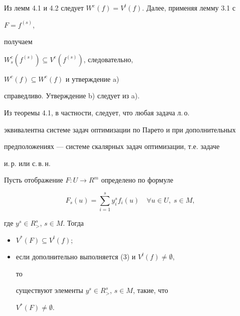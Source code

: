 \begin{pf}


Из лемм 4.1 и 4.2 следует $W^e(f)=V^l(f)$. Далее, применяя лемму 3.1 с


$F=f^{(s)}$,


получаем


$W^c_s(f^{(s)})\subseteq V^e(f^{(s)})$, следовательно,


$W^c(f)\subseteq W^e(f)$ и утверждение a)


справедливо. Утверждение b) следует из a).


\end{pf}





Из теоремы 4.1, в частности, следует, что любая задача л.\,о.


эквивалентна системе задач оптимизации по Парето и при дополнительных


предположениях --- системе скалярных задач оптимизации, т.е. задаче


и.\,р. или с.\,в.\,н.





\begin{cors}


Пусть отображение $F:U\to R^m$ определено по формуле


\begin{equation}


F_s(u)=\sum^s_{i=1}y^s_i f_i(u)\quad \forall u\in U,\;s\in M,


\end{equation}


где $y^s\in R^s_{>}$, $s\in M$. Тогда


\begin{itemize}


\item[a)] $V^*(F)\subseteq V^l(f)$;


\item[b)] если дополнительно выполняется (3) и $V^l(f)\ne\emptyset$,


то


существуют элементы $y^s\in R^s_{>}$, $s\in M$, такие, что


$V^*(F)\ne\emptyset$.


\end{itemize}


\end{cors}





